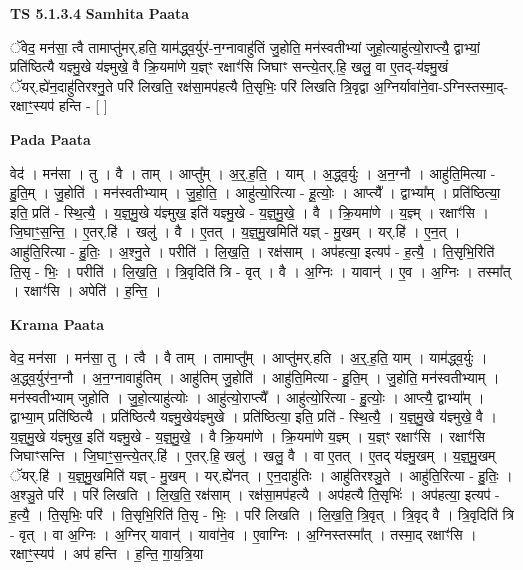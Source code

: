 \documentclass[17pt]{extarticle}
\begin{document}
\textbf{TS 5.1.3.4 } \newline
\textbf{Samhita Paata} \newline

ॅवेद॒ मन॑सा॒ त्वै तामाप्तु॑मर्.हति॒ याम॑द्ध्व॒र्युर॑-न॒ग्नावाहु॑तिं जु॒होति॒ मन॑स्वतीभ्यां जुहो॒त्याहु॑त्यो॒राप्त्यै॒ द्वाभ्यां॒ प्रति॑ष्ठित्यै यज्ञ्मु॒खे य॑ज्ञ्मुखे॒ वै क्रि॒यमा॑णे य॒ज्ञ्ꣳ रक्षाꣳ॑सि जिघाꣳ सन्त्ये॒तर्.हि॒ खलु॒ वा ए॒तद्-य॑ज्ञ्मु॒खं ॅयर्.ह्ये॑न॒दाहु॑तिरश्नु॒ते परि॑ लिखति॒ रक्ष॑सा॒मप॑हत्यै ति॒सृभिः॒ परि॑ लिखति त्रि॒वृद्वा अ॒ग्निर्यावा॑ने॒वा-ऽग्निस्तस्मा॒द्-रक्षाꣳ॒॒स्यप॑ हन्ति - [  ] \newline

\textbf{Pada Paata} \newline

वेद॑ । मन॑सा । तु । वै । ताम् । आप्तु᳚म् । अ॒र्॒.ह॒ति॒ । याम् । अ॒द्ध्व॒र्युः । अ॒न॒ग्नौ । आहु॑ति॒मित्या - हु॒ति॒म् । जु॒होति॑ । मन॑स्वतीभ्याम् । जु॒हो॒ति॒ । आहु॑त्यो॒रित्या - हू॒त्योः॒ । आप्त्यै᳚ । द्वाभ्या᳚म् । प्रति॑ष्ठित्या॒ इति॒ प्रति॑ - स्थि॒त्यै॒ । य॒ज्ञ्॒मु॒खे य॑ज्ञ्मुख॒ इति॑ यज्ञ्मु॒खे - य॒ज्ञ्॒मु॒खे॒ । वै । क्रि॒यमा॑णे । य॒ज्ञ्म् । रक्षाꣳ॑सि । जि॒घाꣳ॒॒स॒न्ति॒ । ए॒तर्.हि॑ । खलु॑ । वै । ए॒तत् । य॒ज्ञ्॒मु॒खमिति॑ यज्ञ् - मु॒खम् । यर्.हि॑ । ए॒न॒त् । आहु॑ति॒रित्या - हु॒तिः॒ । अ॒श्नु॒ते । परीति॑ । लि॒ख॒ति॒ । रक्ष॑साम् । अप॑हत्या॒ इत्यप॑ - ह॒त्यै॒ । ति॒सृभि॒रिति॑ ति॒सृ - भिः॒ । परीति॑ । लि॒ख॒ति॒ । त्रि॒वृदिति॑ त्रि - वृत् । वै । अ॒ग्निः । यावान्॑ । ए॒व । अ॒ग्निः । तस्मा᳚त् । रक्षाꣳ॑सि । अपेति॑ । ह॒न्ति॒ ।  \newline


\textbf{Krama Paata} \newline

वेद॒ मन॑सा । मन॑सा॒ तु । त्वै । वै ताम् । तामाप्तु᳚म् । आप्तु॑मर्.हति । अ॒र्॒.ह॒ति॒ याम् । याम॑द्ध्व॒र्युः । अ॒द्ध्व॒र्युर॑न॒ग्नौ । अ॒न॒ग्नावाहु॑तिम् । आहु॑तिम् जु॒होति॑ । आहु॑ति॒मित्या - हु॒ति॒म् । जु॒होति॒ मन॑स्वतीभ्याम् । मन॑स्वतीभ्याम् जुहोति । जु॒हो॒त्याहु॑त्योः । आहु॑त्यो॒राप्त्यै᳚ । आहु॑त्यो॒रित्या - हु॒त्योः॒ । आप्त्यै॒ द्वाभ्या᳚म् । द्वाभ्या॒म् प्रति॑ष्ठित्यै । प्रति॑ष्ठित्यै यज्ञ्मु॒खेय॑ज्ञ्मुखे । प्रति॑ष्ठित्या॒ इति॒ प्रति॑ - स्थि॒त्यै॒ । य॒ज्ञ्॒मु॒खे य॑ज्ञ्मुखे॒ वै । य॒ज्ञ्॒मु॒खे य॑ज्ञ्मुख॒ इति॑ यज्ञ्मु॒खे - य॒ज्ञ्॒मु॒खे॒ । वै क्रि॒यमा॑णे । क्रि॒यमा॑णे य॒ज्ञ्म् । य॒ज्ञ्ꣳ रक्षाꣳ॑सि । रक्षाꣳ॑सि जिघाꣳसन्ति । जि॒घाꣳ॒॒स॒न्त्ये॒तर्.हि॑ । ए॒तर्.हि॒ खलु॑ । खलु॒ वै । वा ए॒तत् । ए॒तद् य॑ज्ञ्मु॒खम् । य॒ज्ञ्॒मु॒खम् ॅयर्.हि॑ । य॒ज्ञ्॒मु॒खमिति॑ यज्ञ् - मु॒खम् । यर्.ह्ये॑नत् । ए॒न॒दाहु॑तिः । आहु॑तिरश्ञु॒ते । आहु॑ति॒रित्या - हु॒तिः॒ । अ॒श्ञु॒ते परि॑ । परि॑ लिखति । लि॒ख॒ति॒ रक्ष॑साम् । रक्ष॑सा॒मप॑हत्यै । अप॑हत्यै ति॒सृभिः॑ । अप॑हत्या॒ इत्यप॑ - ह॒त्यै॒ । ति॒सृभिः॒ परि॑ । ति॒सृभि॒रिति॑ ति॒सृ - भिः॒ । परि॑ लिखति । लि॒ख॒ति॒ त्रि॒वृत् । त्रि॒वृद् वै । त्रि॒वृदिति॑ त्रि - वृत् । वा अ॒ग्निः । अ॒ग्निर् यावान्॑ । यावा॑ने॒व । ए॒वाग्निः । अ॒ग्निस्तस्मा᳚त् । तस्मा॒द् रक्षाꣳ॑सि । रक्षाꣳ॒॒स्यप॑ । अप॑ हन्ति । ह॒न्ति॒ गा॒य॒त्रि॒या \newline
\end{document}
